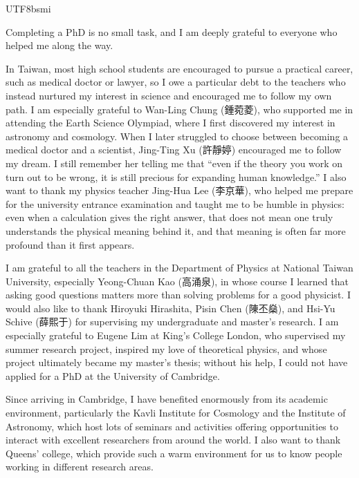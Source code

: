 \documentclass[12pt,a4paper]{report}
\begin{document}
\begin{CJK}{UTF8}{bsmi}

Completing a PhD is no small task, and I am deeply grateful to everyone who helped me along the way.

In Taiwan, most high school students are encouraged to pursue a practical career, such as medical doctor or lawyer, so I owe a particular debt to the teachers who instead nurtured my interest in science and encouraged me to follow my own path. I am especially grateful to Wan-Ling Chung (鍾菀菱), who supported me in attending the Earth Science Olympiad, where I first discovered my interest in astronomy and cosmology. When I later struggled to choose between becoming a medical doctor and a scientist, Jing-Ting Xu (許靜婷) encouraged me to follow my dream. I still remember her telling me that ``even if the theory you work on turn out to be wrong, it is still precious for expanding human knowledge.'' I also want to thank my physics teacher Jing-Hua Lee (李京華), who helped me prepare for the university entrance examination and taught me to be humble in physics: even when a calculation gives the right answer, that does not mean one truly understands the physical meaning behind it, and that meaning is often far more profound than it first appears.

I am grateful to all the teachers in the Department of Physics at National Taiwan University, especially Yeong-Chuan Kao (高涌泉), in whose course I learned that asking good questions matters more than solving problems for a good physicist. I would also like to thank Hiroyuki Hirashita, Pisin Chen (陳丕燊), and Hsi-Yu Schive (薛熙于) for supervising my undergraduate and master's research. I am especially grateful to Eugene Lim at King's College London, who supervised my summer research project, inspired my love of theoretical physics, and whose project ultimately became my master's thesis; without his help, I could not have applied for a PhD at the University of Cambridge.

Since arriving in Cambridge, I have benefited enormously from its academic environment, particularly the Kavli Institute for Cosmology and the Institute of Astronomy, which host lots of seminars and activities offering opportunities to interact with excellent researchers from around the world. I also want to thank Queens' college, which provide such a warm environment for us to know people working in different research areas. 


\end{CJK}
\end{document}
